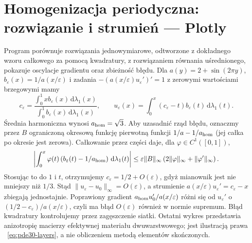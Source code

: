 \section{Homogenizacja periodyczna: rozwiązanie i strumień — Plotly}
\label{sec:pde30-code}
Program porównuje rozwiązania jednowymiarowe, odtworzone
z dokładnego wzoru całkowego za pomocą kwadratury,
z rozwiązaniem równania uśrednionego, pokazuje oscylacje
gradientu oraz zbieżność błędu.
Dla $a(y)=2+\sin(2\pi y)$, $b_\varepsilon(x)=1/a(x/\varepsilon)$
i zadania $-(a(x/\varepsilon)u_\varepsilon')'=1$
z zerowymi wartościami brzegowymi mamy
\[
 c_\varepsilon=
 \frac{\int_0^1 x b_\varepsilon(x)\,\mathrm d\lambda_1(x)}
 {\int_0^1 b_\varepsilon(x)\,\mathrm d\lambda_1(x)},
 \qquad
 u_\varepsilon(x)=\int_0^x(c_\varepsilon-t)b_\varepsilon(t)
 \,\mathrm d\lambda_1(t).
\]
Średnia harmoniczna wynosi $a_{\rm hom}=\sqrt3$.
Aby uzasadnić rząd błędu, oznaczmy przez $B$
ograniczoną okresową funkcję pierwotną funkcji
$1/a-1/a_{\rm hom}$ (jej całka po okresie jest zerowa).
Całkowanie przez części daje, dla $\varphi\in C^1([0,1])$,
\[
 \left|\int_0^x\varphi(t)
 \left(b_\varepsilon(t)-1/a_{\rm hom}\right)
 \,\mathrm d\lambda_1(t)\right|
 \le\varepsilon\|B\|_\infty
 \left(2\|\varphi\|_\infty+\|\varphi'\|_\infty\right).
\]
Stosując to do $1$ i $t$, otrzymujemy
$c_\varepsilon=1/2+O(\varepsilon)$, gdyż
mianownik jest nie mniejszy niż $1/3$.
Stąd $\|u_\varepsilon-u_0\|_\infty=O(\varepsilon)$,
a strumienie $a(x/\varepsilon)u_\varepsilon'=c_\varepsilon-x$
zbiegają jednostajnie. Poprawiony gradient
$a_{\rm hom}u_0'/a(x/\varepsilon)$ różni się
od $u_\varepsilon'$ o $(1/2-c_\varepsilon)/a(x/\varepsilon)$,
czyli ma błąd $O(\varepsilon)$ również w normie supremum.
Błąd kwadratury kontrolujemy przez zagęszczenie siatki.
Ostatni wykres przedstawia anizotropię macierzy efektywnej
materiału dwuwarstwowego; jest ilustracją prawa
~\eqref{eq:pde30-layers}, a nie obliczeniem metodą elementów skończonych.
